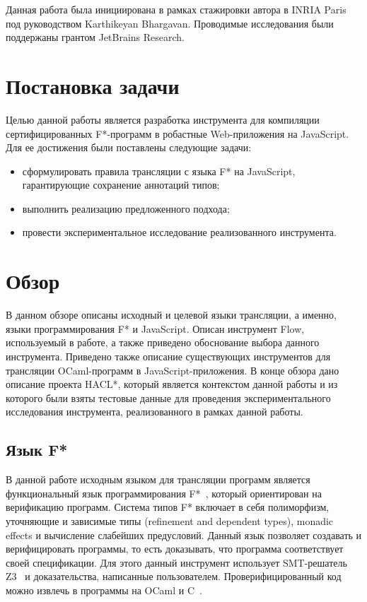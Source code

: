 \documentclass[12pt]{matmex-diploma}
\begin{document}
Данная работа была инициирована в рамках стажировки автора в INRIA Paris под руководством Karthikeyan Bhargavan. Проводимые исследования были поддержаны грантом JetBrains Research.

\section{Постановка задачи}
Целью данной работы является разработка инструмента для компиляции сертифицированных F*-программ в робастные Web-приложения на JavaScript. Для ее достижения были поставлены следующие задачи:

\begin{itemize}
\item сформулировать правила трансляции с языка F* на JavaScript, гарантирующие сохранение аннотаций типов;
\item выполнить реализацию предложенного подхода;
\item провести экспериментальное исследование реализованного инструмента.
\end{itemize} 

\section{Обзор}

В данном обзоре описаны исходный и целевой языки трансляции, а именно, языки программирования F* и JavaScript. Описан инструмент Flow, используемый в работе, а также приведено обоснование выбора данного инструмента. Приведено также описание существующих инструментов для трансляции OCaml-программ в JavaScript-приложения. В конце обзора дано описание проекта HACL*, который является контекстом данной работы и из которого были взяты тестовые данные для проведения экспериментального исследования инструмента, реализованного в рамках данной работы. 

\subsection{Язык F*}

В данной работе исходным языком для трансляции программ является функциональный язык программирования F*~\cite{fstargh, fstarCite, fstar}, который ориентирован на верификацию программ. Система типов F* включает в себя полиморфизм, уточняющие и зависимые типы (refinement and dependent types), monadic effects и вычисление слабейших предусловий. Данный язык позволяет создавать и верифицировать программы, то есть доказывать, что программа соответствует своей спецификации. Для этого данный инструмент использует SMT-решатель Z3~\cite{z3Cite} и доказательства, написанные пользователем. Проверифицированный код можно извлечь в программы на OCaml и C~\cite{kremlin}. 
\end{document}
